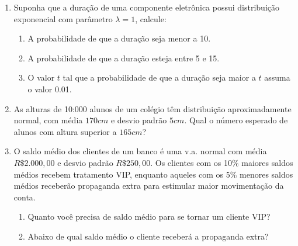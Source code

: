 \begin{enumerate}
\begin{enumerate}[label=\alph*)]
	\end{enumerate}

\setcounter{enumi}{2}
\item Suponha que a duração de uma componente eletrônica possui distribuição exponencial com parâmetro $\lambda = 1$, calcule:

	\solv{
		\[
			f(x) = \left\{
			\begin{array}{cc}
				\dfrac{1}{\lambda}e^{\frac{-x}{\lambda}}, & x>0;\\
				0, & c.c
			\end{array}\right.
			\hfill,\ \lambda = 1
		\]
	}
	\begin{enumerate}[label=\alph*)]
		\item A probabilidade de que a duração seja menor a 10.
		
		
		\item A probabilidade de que a duração esteja entre 5 e 15.
		
		
		\item O valor $t$ tal que a probabilidade de que a duração seja maior a $t$ assuma o valor 0.01.
		
	\end{enumerate}

\item As alturas de 10:000 alunos de um colégio têm distribuição aproximadamente normal, com média $170cm$ e desvio padrão $5cm$. Qual o número esperado de alunos com altura superior a $165cm$?

\setcounter{enumi}{10}
\item O saldo médio dos clientes de um banco é uma v.a. normal com média $R\$ 2.000,00$ e desvio padrão $R\$ 250,00$. Os clientes com os 10\% maiores saldos médios recebem tratamento VIP, enquanto aqueles com os 5\% menores saldos médios receberão propaganda extra para estimular maior movimentação da conta.
	\begin{enumerate}[label=\alph*)]
		\item Quanto você precisa de saldo médio para se tornar um cliente VIP?
		\item Abaixo de qual saldo médio o cliente receberá a propaganda extra?
	\end{enumerate}
\end{enumerate}